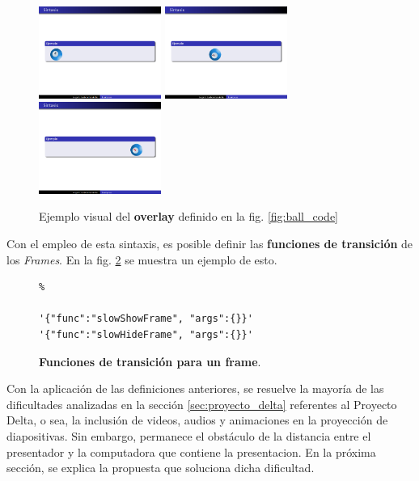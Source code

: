  		\begin{figure}[tb]
 			\centering
 			\includegraphics[width=4cm]{img/ball-left}
 			\includegraphics[width=4cm]{img/ball-middle}
 			\includegraphics[width=4cm]{img/ball-right}
 			\caption{Ejemplo visual del \textbf{overlay} definido en la fig. \ref{fig:ball_code}}
 			\label{fig:ball_visual} 
 		\end{figure}	


	Con el empleo de esta sintaxis, es posible definir las \textbf{funciones de transición} de los \textit{Frames}. En la fig. \ref{fig:frame_trans} se muestra un ejemplo de esto.

		\begin{figure}[htb]%
			\begin{lstlisting}%

'{"func":"slowShowFrame", "args":{}}'
'{"func":"slowHideFrame", "args":{}}'
			\end{lstlisting}
		\caption{
			\textbf{Funciones de transición para un frame}. 
			\label{fig:frame_trans} }
		\end{figure}	
	

		Con la aplicación de las definiciones anteriores, se resuelve la mayoría de las dificultades analizadas en la sección \ref{sec:proyecto_delta} referentes al Proyecto Delta, o sea, la inclusión de videos, audios y animaciones en la proyección de diapositivas. Sin embargo, permanece el obstáculo de la distancia entre el presentador y la computadora que contiene la presentacion. En la próxima sección, se explica la propuesta que soluciona dicha dificultad.

